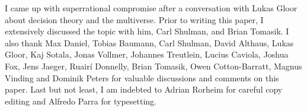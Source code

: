 I came up with superrational compromise after a conversation with Lukas
Gloor about decision theory and the multiverse. Prior to writing this
paper, I extensively discussed the topic with him, Carl Shulman, and
Brian Tomasik. I also thank Max Daniel, Tobias Baumann, Carl Shulman,
David Althaus, Lukas Gloor, Kaj Sotala, Jonas Vollmer, Johannes
Treutlein, Lucius Caviola, Joshua Fox, Jens Jaeger, Ruairí Donnelly,
Brian Tomasik, Owen Cotton-Barratt, Magnus Vinding and Dominik Peters for
valuable discussions and comments on this paper. Last but not least, I
am indebted to Adrian Rorheim for careful copy editing and Alfredo Parra for typesetting.
